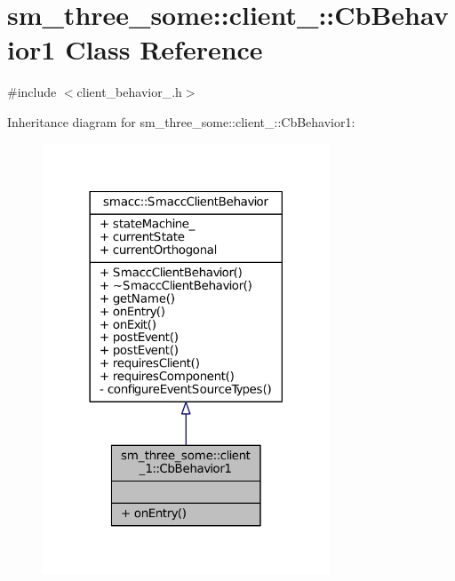 \hypertarget{classsm__three__some_1_1client__1_1_1CbBehavior1}{}\section{sm\+\_\+three\+\_\+some\+:\+:client\+\_\+:\+:Cb\+Behavior1 Class Reference}
\label{classsm__three__some_1_1client__1_1_1CbBehavior1}


{\ttfamily \#include $<$client\+\_\+behavior\+\_.\+h$>$}



Inheritance diagram for sm\+\_\+three\+\_\+some\+:\+:client\+\_\+:\+:Cb\+Behavior1\+:
\nopagebreak
\begin{figure}[H]
\begin{center}
\leavevmode
\includegraphics[width=242pt]{classsm__three__some_1_1client__1_1_1CbBehavior1__inherit__graph}
\end{center}
\end{figure}



